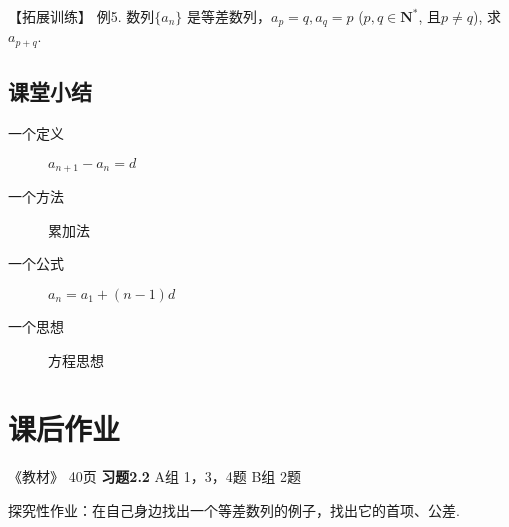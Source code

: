 \documentclass[10pt,a4paper]{article}
\begin{document}
				【拓展训练】 例5. 数列$\{a_n\}$ 是等差数列，$a_p=q, a_q=p$ ($p,q \in \mathbf{N}^*$, 且$p\neq q$), 求$a_{p+q}$.



		\subsection{课堂小结}
		
			\begin{description}
			\item[一个定义] $a_{n+1}-a_n=d$
			\item[一个方法] 累加法
			\item[一个公式] $a_n=a_1+(n-1)d$
			\item[一个思想] 方程思想
			\end{description}


		\section{课后作业}

			《教材》 40页 \hspace{10pt}\textbf{习题2.2 } \hspace{10pt}  A组 1，3，4题  \hspace{10pt}  B组 2题

			探究性作业：在自己身边找出一个等差数列的例子，找出它的首项、公差. 
\end{document}
